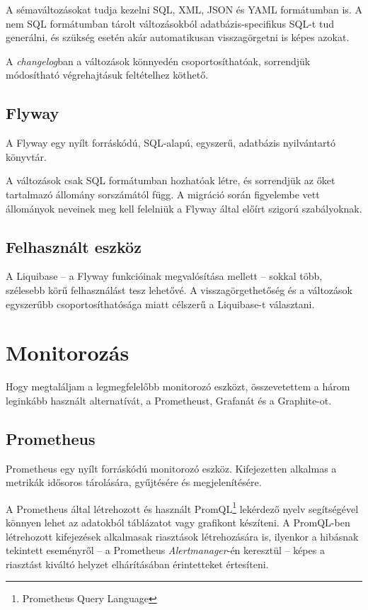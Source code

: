 A sémaváltozásokat tudja kezelni SQL, XML, JSON és YAML formátumban is. A nem SQL formátumban tárolt változásokból adatbázis-specifikus SQL-t tud generálni, és szükség esetén akár automatikusan visszagörgetni is képes azokat.

A \textit{changelog}ban a változások könnyedén csoportosíthatóak, sorrendjük módosítható végrehajtásuk feltételhez köthető.


\subsection{Flyway}
A Flyway egy nyílt forráskódú, SQL-alapú, egyszerű, adatbázis nyilvántartó könyvtár.

A változások csak SQL formátumban hozhatóak létre, és sorrendjük az őket tartalmazó állomány sorszámától függ. A migráció során figyelembe vett állományok neveinek meg kell felelniük a Flyway által előírt szigorú szabályoknak.


\subsection{Felhasznált eszköz}
A Liquibase --  a Flyway funkcióinak megvalósítása mellett --   sokkal több, szélesebb körű felhasználást tesz lehetővé. A visszagörgethetőség és a változások egyszerűbb csoportosíthatósága miatt célszerű a Liquibase-t választani.




\section{Monitorozás}\label{sec:metrikak_tervezes}
Hogy megtaláljam a legmegfelelőbb monitorozó eszközt, összevetettem a három leginkább használt alternatívát, a Prometheust, Grafanát és a Graphite-ot.

\subsection{Prometheus}
Prometheus egy nyílt forráskódú monitorozó eszköz. Kifejezetten alkalmas a metrikák idősoros tárolására, gyűjtésére és megjelenítésére.

A Prometheus által létrehozott és használt PromQL\footnote{Prometheus Query Language} lekérdező nyelv segítségével könnyen lehet az adatokból táblázatot vagy grafikont készíteni. A PromQL-ben létrehozott kifejezések alkalmasak riasztások létrehozására is, ilyenkor a hibásnak tekintett eseményről --  a Prometheus \textit{Alertmanager}-én keresztül --   képes a riasztást kiváltó helyzet elhárításában érintetteket értesíteni.

